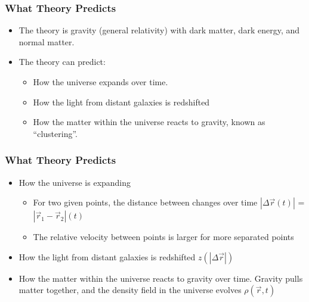 \documentclass{beamer}
\begin{document}
\frame
{

    \frametitle{What Theory Predicts}


    \begin{itemize}

        \item The theory is gravity (general relativity) with dark matter, dark
            energy, and normal matter.

        \item The theory can predict:
            
            \begin{itemize}

                \item How the universe expands over time.

                \item How the light from distant galaxies is redshifted

                \item How the matter within the universe reacts to gravity, known
                    as ``clustering''.

            \end{itemize}

    \end{itemize}

}


\frame
{

    \frametitle{What Theory Predicts}



    \begin{itemize}

        \item How the universe is expanding

            \begin{itemize}
                    
                \item For two given points, the distance between changes over
                    time {\color{gold} $|\Delta \vec{r} (t)|$ =
                     $| \vec{r}_1 - \vec{r}_2 |(t) $ }

                \item The relative velocity between points is larger
                    for more separated points

            \end{itemize}

        \item How the light from distant galaxies is redshifted {\color{gold}
            $z(|\Delta \vec{r}|)$}

        \item How the matter within the universe reacts to gravity over time.
            Gravity pulls matter together, and the density field
            in the universe evolves {\color{gold} $\rho(\vec{r},t)$}



    \end{itemize}

}
\end{document}
